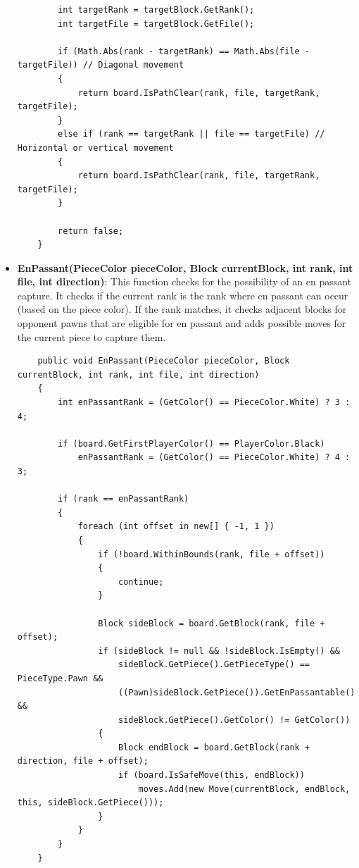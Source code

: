 \documentclass[a4paper,12pt]{article}
\begin{document}
\begin{itemize}
\begin{verbatim}
        int targetRank = targetBlock.GetRank();
        int targetFile = targetBlock.GetFile();

        if (Math.Abs(rank - targetRank) == Math.Abs(file - targetFile)) // Diagonal movement
        {
            return board.IsPathClear(rank, file, targetRank, targetFile);
        }
        else if (rank == targetRank || file == targetFile) // Horizontal or vertical movement
        {
            return board.IsPathClear(rank, file, targetRank, targetFile);
        }

        return false;
    }
    \end{verbatim}

    \item \textbf{EnPassant(PieceColor pieceColor, Block currentBlock, int rank, int file, int direction)}: 
    This function checks for the possibility of an en passant capture. It checks if the current rank is the rank where en passant can occur (based on the piece color). If the rank matches, it checks adjacent blocks for opponent pawns that are eligible for en passant and adds possible moves for the current piece to capture them.

    \begin{verbatim}
    public void EnPassant(PieceColor pieceColor, Block currentBlock, int rank, int file, int direction)
    {
        int enPassantRank = (GetColor() == PieceColor.White) ? 3 : 4;

        if (board.GetFirstPlayerColor() == PlayerColor.Black)
            enPassantRank = (GetColor() == PieceColor.White) ? 4 : 3;

        if (rank == enPassantRank)
        {
            foreach (int offset in new[] { -1, 1 })
            {
                if (!board.WithinBounds(rank, file + offset))
                {
                    continue;
                }

                Block sideBlock = board.GetBlock(rank, file + offset);
                if (sideBlock != null && !sideBlock.IsEmpty() &&
                    sideBlock.GetPiece().GetPieceType() == PieceType.Pawn &&
                    ((Pawn)sideBlock.GetPiece()).GetEnPassantable() &&
                    sideBlock.GetPiece().GetColor() != GetColor())
                {
                    Block endBlock = board.GetBlock(rank + direction, file + offset);
                    if (board.IsSafeMove(this, endBlock))
                        moves.Add(new Move(currentBlock, endBlock, this, sideBlock.GetPiece()));
                }
            }
        }
    }
    \end{verbatim}


\end{itemize}
\end{document}
